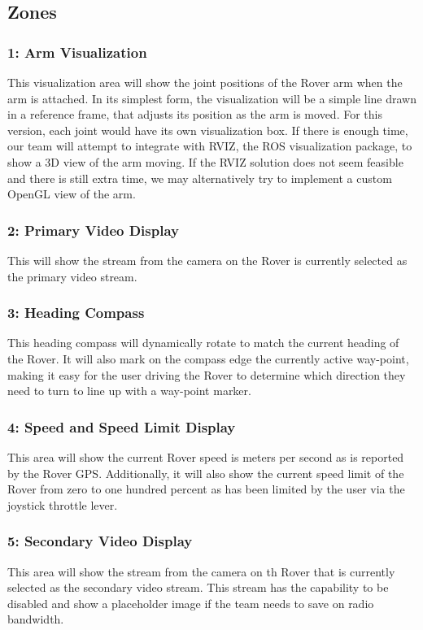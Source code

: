 \subsection{Zones}
\subsubsection{1: Arm Visualization}
This visualization area will show the joint positions of the Rover arm when the arm is attached.
In its simplest form, the visualization will be a simple line drawn in a reference frame, that adjusts its position as the arm is moved.
For this version, each joint would have its own visualization box.
If there is enough time, our team will attempt to integrate with RVIZ, the ROS visualization package, to show a 3D view of the arm moving.
If the RVIZ solution does not seem feasible and there is still extra time, we may alternatively try to implement a custom OpenGL view of the arm.

\subsubsection{2: Primary Video Display}
This will show the stream from the camera on the Rover is currently selected as the primary video stream.


\subsubsection{3: Heading Compass}
This heading compass will dynamically rotate to match the current heading of the Rover.
It will also mark on the compass edge the currently active way-point, making it easy for the user driving the Rover to determine which direction they need to turn to line up with a way-point marker.


\subsubsection{4: Speed and Speed Limit Display}
This area will show the current Rover speed is meters per second as is reported by the Rover GPS.
Additionally, it will also show the current speed limit of the Rover from zero to one hundred percent as has been limited by the user via the joystick throttle lever.


\subsubsection{5: Secondary Video Display}
This area will show the stream from the camera on th Rover that is currently selected as the secondary video stream.
This stream has the capability to be disabled and show a placeholder image if the team needs to save on radio bandwidth.


